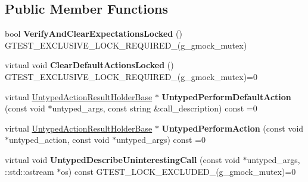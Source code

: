 \subsection*{Public Member Functions}
\begin{DoxyCompactItemize}
\item 
\mbox{\label{classtesting_1_1internal_1_1_untyped_function_mocker_base_a3f1d62a1662a3daa2895b3af963be269}} 
bool {\bfseries Verify\+And\+Clear\+Expectations\+Locked} () G\+T\+E\+S\+T\+\_\+\+E\+X\+C\+L\+U\+S\+I\+V\+E\+\_\+\+L\+O\+C\+K\+\_\+\+R\+E\+Q\+U\+I\+R\+E\+D\+\_\+(g\+\_\+gmock\+\_\+mutex)
\item 
\mbox{\label{classtesting_1_1internal_1_1_untyped_function_mocker_base_a40ddd95736946a7951033aa89a7b617f}} 
virtual void {\bfseries Clear\+Default\+Actions\+Locked} () G\+T\+E\+S\+T\+\_\+\+E\+X\+C\+L\+U\+S\+I\+V\+E\+\_\+\+L\+O\+C\+K\+\_\+\+R\+E\+Q\+U\+I\+R\+E\+D\+\_\+(g\+\_\+gmock\+\_\+mutex)=0
\item 
\mbox{\label{classtesting_1_1internal_1_1_untyped_function_mocker_base_a2cb149456cd559d5b0615f2310b235e3}} 
virtual \mbox{\hyperlink{classtesting_1_1internal_1_1_untyped_action_result_holder_base}{Untyped\+Action\+Result\+Holder\+Base}} $\ast$ {\bfseries Untyped\+Perform\+Default\+Action} (const void $\ast$untyped\+\_\+args, const string \&call\+\_\+description) const =0
\item 
\mbox{\label{classtesting_1_1internal_1_1_untyped_function_mocker_base_ada5a72303863d0aa655b66338b8efea5}} 
virtual \mbox{\hyperlink{classtesting_1_1internal_1_1_untyped_action_result_holder_base}{Untyped\+Action\+Result\+Holder\+Base}} $\ast$ {\bfseries Untyped\+Perform\+Action} (const void $\ast$untyped\+\_\+action, const void $\ast$untyped\+\_\+args) const =0
\item 
\mbox{\label{classtesting_1_1internal_1_1_untyped_function_mocker_base_a48a17fa75b744c2bfb19ee1f54d51759}} 
virtual void {\bfseries Untyped\+Describe\+Uninteresting\+Call} (const void $\ast$untyped\+\_\+args, \+::std\+::ostream $\ast$os) const G\+T\+E\+S\+T\+\_\+\+L\+O\+C\+K\+\_\+\+E\+X\+C\+L\+U\+D\+E\+D\+\_\+(g\+\_\+gmock\+\_\+mutex)=0

\end{DoxyCompactItemize}
